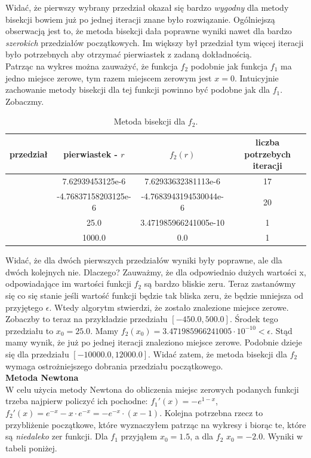 \documentclass[]{article}
\begin{document}
	Widać, że pierwszy wybrany przedział okazał się bardzo \textit{wygodny} dla metody bisekcji bowiem już po jednej iteracji znane było rozwiązanie. Ogólniejszą obserwacją jest to, że metoda bisekcji dała poprawne wyniki nawet dla bardzo \textit{szerokich} przedziałów początkowych. Im większy był przedział tym więcej iteracji było potrzebnych aby otrzymać pierwiastek z zadaną dokładnością.\\
	Patrząc na wykres można zauważyć, że funkcja $f_2$ podobnie jak funkcja $f_1$ ma jedno miejsce zerowe, tym razem miejscem zerowym jest $x=0$. Intuicyjnie zachowanie metody bisekcji dla tej funkcji powinno być podobne jak dla $f_1$. Zobaczmy.
	\clearpage
		\begin{table}[!h]
		\centering
		\label{tab:table1}
		\begin{tabular}{|c|c|c|c|}
			\hline
			przedział & pierwiastek - $r$ & $f_2(r)$ & liczba potrzebych iteracji\\
			\hline
			[-1.0, 2.0] & 7.62939453125e-6 & 7.62933632381113e-6 & 17 \\ \hline
			[-10.0, 25.0] & -4.76837158203125e-6 & -4.7683943194530044e-6 & 20 \\ \hline
			[-450.0, 500.0] & 25.0 & 3.471985966241005e-10 & 1 \\ \hline
			[-10000.0, 12000.0] & 1000.0 & 0.0 & 1 \\ \hline
		\end{tabular}
	\caption*{Metoda bisekcji dla $f_2$.}
	\end{table}

	Widać, że dla dwóch pierwszych przedziałów wyniki były poprawne, ale dla dwóch kolejnych nie. Dlaczego? Zauważmy, że dla odpowiednio dużych wartości x, odpowiadające im wartości funkcji $f_2$ są bardzo bliskie zeru. Teraz zastanówmy się co się stanie jeśli wartość funkcji będzie tak bliska zeru, że będzie mniejsza od przyjętego $\epsilon$. Wtedy algorytm stwierdzi, że zostało znalezione miejsce zerowe. Zobaczby to teraz na przykładzie przedziału $[-450.0, 500.0]$. Środek tego przedziału to $x_0=25.0$. Mamy $f_2(x_0)=3.471985966241005\cdot10^{-10}<\epsilon$. Stąd mamy wynik, że już po jednej iteracji znaleziono miejsce zerowe. Podobnie dzieje się dla przedziału $[-10000.0, 12000.0]$. Widać zatem, że metoda bisekcji dla $f_2$ wymaga ostrożniejszego dobrania przedziału początkowego.\\
	\textbf{Metoda Newtona}\\
	W celu użycia metody Newtona do obliczenia miejsc zerowych podanych funkcji trzeba najpierw policzyć ich pochodne: $f_1'(x) = -e^{1-x}$, 
	$f_2'(x) = e^{-x} - x\cdot e^{-x} =-e^{-x}\cdot\left(x-1\right)$. Kolejna potrzebna rzecz to przybliżenie początkowe, które wyznaczyłem patrząc na wykresy i biorąc te, które są \textit{niedaleko} zer funkcji. Dla $f_1$ przyjąłem $x_0=1.5$, a dla $f_2$ $x_0=-2.0$. Wyniki w tabeli poniżej.
\end{document}
